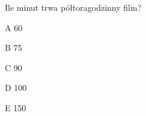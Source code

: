 \begin{tresc}
Ile minut trwa półtoragodzinny film?
\end{tresc}
\begin{wariant}{A} 60 \end{wariant}
\begin{wariant}{B} 75 \end{wariant}
\begin{wariant}{C} 90 \end{wariant}
\begin{wariant}{D} 100 \end{wariant}
\begin{wariant}{E} 150 \end{wariant}
